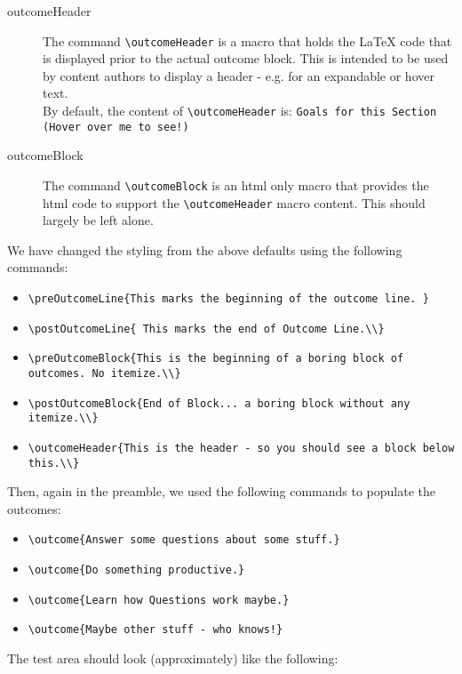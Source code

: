 \documentclass{ximera}
\renewcommand{\preOutcomeLine}{This marks the beginning of the outcome line. }
\renewcommand{\postOutcomeLine}{ This marks the end of Outcome Line.\\}
\renewcommand{\preOutcomeBlock}{This is the beginning of a boring block of outcomes. No itemize.\\}
\renewcommand{\postOutcomeBlock}{End of Block... a boring block without any itemize.\\}
\renewcommand{\outcomeHeader}{This is the header - so you should see a block below this.\\}
\begin{document}
\begin{description}
    \item[outcomeHeader] The command \verb|\outcomeHeader| is a macro that holds the LaTeX code that is displayed prior to the actual outcome block. 
            This is intended to be used by content authors to display a header - e.g. for an expandable or hover text.\\
            By default, the content of \verb|\outcomeHeader| is: \verb|Goals for this Section (Hover over me to see!)|
    \item[outcomeBlock] The command \verb|\outcomeBlock| is an html only macro that provides the html code to support the \verb|\outcomeHeader| macro content. 
        This should largely be left alone.
\end{description}

We have changed the styling from the above defaults using the following commands:
\begin{itemize}
    \item \verb|\preOutcomeLine{This marks the beginning of the outcome line. } |
    \item \verb|\postOutcomeLine{ This marks the end of Outcome Line.\\} |
    \item \verb|\preOutcomeBlock{This is the beginning of a boring block of outcomes. No itemize.\\} |
    \item \verb|\postOutcomeBlock{End of Block... a boring block without any itemize.\\} |
    \item \verb|\outcomeHeader{This is the header - so you should see a block below this.\\} |
\end{itemize}

Then, again in the preamble, we used the following commands to populate the outcomes:
\begin{itemize}
    \item \verb|\outcome{Answer some questions about some stuff.} |
    \item \verb|\outcome{Do something productive.} |
    \item \verb|\outcome{Learn how Questions work maybe.} |
    \item \verb|\outcome{Maybe other stuff - who knows!} |
\end{itemize}

The test area should look (approximately) like the following:
\end{document}
